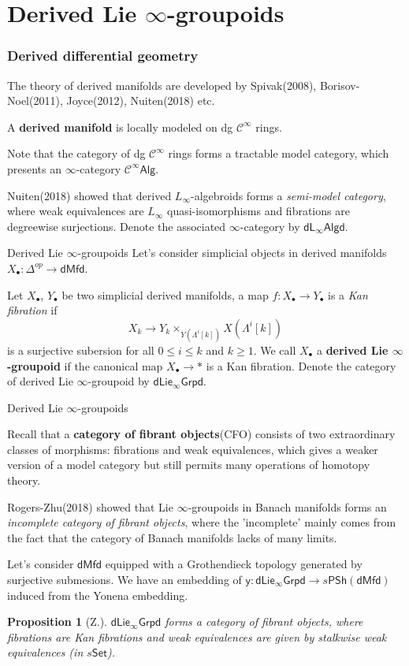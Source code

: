 \documentclass{beamer}
\newtheorem{prop}[thm]{Proposition}
\theoremstyle{definition}
\theoremstyle{remark}
\numberwithin{equation}{section}
\newcommand{\y}{\mathsf{y}}
\newcommand{\psh}{\mathsf{PSh}}
\newcommand{\set}{\mathsf{Set}}
\newcommand{\dm}{\mathsf{dMfd}}
\newcommand{\lgpi}{\mathsf{dLie_{\infty}Grpd}}
\newcommand{\lali}{\mathsf{dL_{\infty}Algd}}
\newcommand{\cialg}{\mathcal{C}^{\infty}\mathsf{Alg}}
\begin{document}
\section{Derived Lie $\infty$-groupoids}
\begin{frame}
\frametitle{Derived differential geometry}

The theory of derived manifolds are developed by Spivak(2008), Borisov-Noel(2011), Joyce(2012), Nuiten(2018) etc.

\begin{definition}[Nuiten 2018]
A {\bf derived manifold} is locally modeled on dg $\mathcal{C}^{\infty}$ rings. 
\end{definition}

Note that the category of dg $\mathcal{C}^{\infty}$ rings forms a tractable model category, which presents an $\infty$-category $\cialg$.

Nuiten(2018) showed that derived $L_{\infty}$-algebroids forms a {\it semi-model category}, where weak equivalences are $L_{\infty}$ quasi-isomorphisms and fibrations are degreewise surjections. Denote the associated $\infty$-category by $\lali$.
\end{frame}
\begin{frame}{Derived Lie $\infty$-groupoids}
Let's consider simplicial objects in derived manifolds $X_{\bullet}: \Delta^{op} \to \dm$.

Let $X_{\bullet}$, $Y_{\bullet}$ be two simplicial derived manifolds, a map $f: X_{\bullet}\to Y_{\bullet}$ is a {\it Kan fibration} if 
\begin{equation*}
X_k\to Y_k \times_{Y(\Lambda^i[k])} X(\Lambda^i[k])
\end{equation*}
is a surjective subersion for all $0\le i \le k$ and $k\ge 1$. We call $X_{\bullet}$ a {\bf derived Lie $\infty$-groupoid} if the canonical map $ X_{\bullet}\to \ast$ is a Kan fibration. Denote the category of derived Lie $\infty$-groupoid by $\lgpi$. 
\end{frame}
\begin{frame}{Derived Lie $\infty$-groupoids}
	
Recall that a {\bf category of fibrant objects}(CFO) consists of two extraordinary classes of morphisms: fibrations and weak equivalences, which gives a weaker version of a model category but still permits many operations of homotopy theory.

Rogers-Zhu(2018) showed that Lie $\infty$-groupoids in Banach manifolds forms an {\it incomplete category of fibrant objects}, where the 'incomplete' mainly comes from the fact that the category of Banach manifolds lacks of many limits.

Let's consider $\dm$ equipped with a Grothendieck topology generated by surjective submesions. We have an embedding of $\y:\lgpi \to s\psh(\dm)$ induced from the Yonena embedding.
\begin{prop}[Z.]$\lgpi$ forms a category of fibrant objects, where fibrations are Kan fibrations and weak equivalences are given by stalkwise weak equivalences (in $s\set$).
	\end{prop}
\end{frame}
\end{document}
